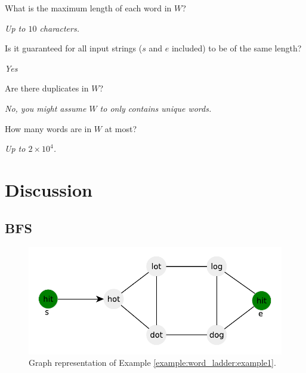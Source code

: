 \begin{QandA}
	\item What is the maximum length of each word in $W$?
	\begin{answered}
		\textit{Up to $10$ characters.}
	\end{answered}
	
	\item Is it guaranteed for all input strings ($s$ and $e$ included) to be of the same length?
	\begin{answered}
		\textit{Yes}
	\end{answered}

	\item Are there duplicates in $W$?
	\begin{answered}
		\textit{No, you might assume $W$ to only contains unique words.}
	\end{answered}

	\item How many words are in $W$ at most?
	\begin{answered}
		\textit{Up to $2\times 10^4$.}
	\end{answered}

\end{QandA}

\section{Discussion}
\label{word_ladder:sec:discussion}


\subsection{BFS}
\label{word_ladder:sec:bruteforce}
\begin{figure}
	\centering
	\includegraphics[width=\textwidth]{sources/word_ladder/images/example1}
	\caption[n]{Graph representation of Example \ref{example:word_ladder:example1}.}
	\label{fig:word_ladder:example1}
\end{figure}



\begin{minipage}{\linewidth}
	
\end{minipage}

